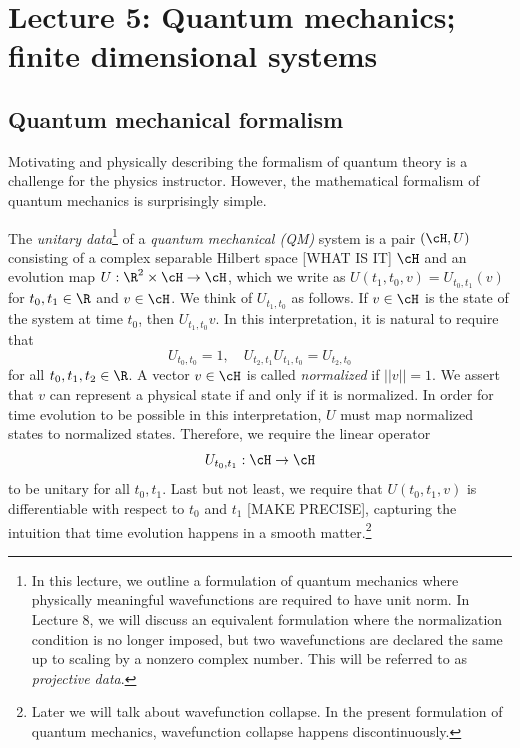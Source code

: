 \newpage
\section{Lecture 5: Quantum mechanics; finite dimensional systems}

\subsection{Quantum mechanical formalism}
Motivating and physically describing the formalism of quantum theory is a challenge for the physics instructor. However, the mathematical formalism of quantum mechanics is surprisingly simple.

\begin{definition}
The \emph{unitary data}\footnote{In this lecture, we outline a formulation of quantum mechanics where physically meaningful wavefunctions are required to have unit norm. In Lecture 8, we will discuss an equivalent formulation where the normalization condition is no longer imposed, but two wavefunctions are declared the same up to scaling by a nonzero complex number. This will be referred to as \emph{projective data}.} of a \emph{quantum mechanical (QM)} system is a pair $(\cH, U)$ consisting of a complex separable Hilbert space [WHAT IS IT] $\cH$ and an evolution map $U: \R^2 \times \cH \to \cH$, which we write as $U(t_1, t_0, v) = U_{t_0, t_1}(v)$ for $t_0, t_1 \in \R$ and $v \in \cH$. We think of $U_{t_1, t_0}$ as follows. If $v \in \cH$ is the state of the system at time $t_0$, then $U_{t_1, t_0} v$. In this interpretation, it is natural to require that
\begin{equation*}
    U_{t_0, t_0} = 1, \quad U_{t_2, t_1} U_{t_1, t_0} = U_{t_2, t_0}
\end{equation*}
for all $t_0, t_1, t_2 \in \R$. A vector $v \in \cH$ is called \emph{normalized} if $||v|| = 1$. We assert that $v$ can represent a physical state if and only if it is normalized. In order for time evolution to be possible in this interpretation, $U$ must map normalized states to normalized states. Therefore, we require the linear operator
\begin{equation*}
    U_{t_0, t_1}: \cH \to \cH
\end{equation*}
to be unitary for all $t_0, t_1$. Last but not least, we require that $U(t_0, t_1, v)$ is differentiable with respect to $t_0$ and $t_1$ [MAKE PRECISE], capturing the intuition that time evolution happens in a smooth matter.\footnote{Later we will talk about wavefunction collapse. In the present formulation of quantum mechanics, wavefunction collapse happens discontinuously.}
\end{definition}


